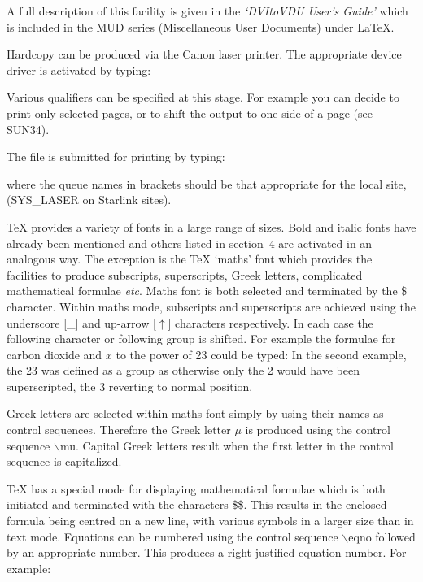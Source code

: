 A full description of this facility is given in the 
{\it `DVItoVDU User's Guide'} which is included in the MUD series 
(Miscellaneous User Documents) under \LaTeX.


Hardcopy can be produced via the Canon laser printer.
The appropriate device driver is activated by typing:
\medskip
{}

Various qualifiers can be specified at this stage.
For example you can decide to print only selected pages, or to 
shift the output to one side of a page (see SUN34).


The file is submitted for printing by typing:
\medskip
{}

where the queue names in brackets should be that appropriate for the local
site, (SYS\_LASER on Starlink sites).



\nobreak
{}
\nobreak

{\TeX} provides a variety of fonts in a large range of sizes.
Bold and italic fonts have already been mentioned and others listed
in section~4 are activated in an analogous way.
The exception is the {\TeX} `maths' font which provides the facilities to
produce subscripts, superscripts, Greek letters, complicated mathematical 
formulae {\it etc}.
Maths font is both selected and terminated by the \$ character.
Within maths mode, subscripts and superscripts are achieved using 
the underscore [\_]
and up-arrow [$\uparrow$] characters respectively.
In each case the following character or following group is shifted.
For example the formulae for carbon dioxide and $x$ to the power of 23 could
be typed:
\medskip
{}
In the second example, the 23 was defined as a group as otherwise only
the 2 would have been superscripted, the 3 reverting to normal position.
 
Greek letters are selected within maths font simply by using their names 
as control sequences. 
Therefore the Greek letter $\mu$ is produced using the control 
sequence $\backslash$mu. 
Capital Greek letters result when the first letter in the control sequence
is capitalized.
 
{\TeX} has a special mode for displaying mathematical formulae which
is both initiated and terminated with the characters \$\$.
This results in the enclosed formula being centred on a new line, with
various symbols in a larger size than in text mode.
Equations can be numbered using the control sequence $\backslash$eqno
followed by an appropriate number.
This produces a right justified equation number. 
For example:
\medskip
{}

